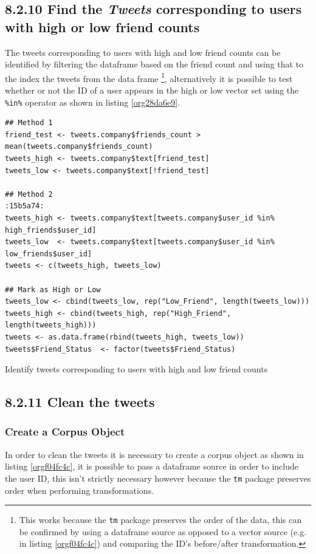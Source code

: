 \documentclass[11pt]{article}
\begin{document}
\subsection{8.2.10 Find the \emph{Tweets} corresponding to users with high or low friend counts}
\label{sec:org5db9549}
The tweets corresponding to users with high and low friend counts can be
identified by filtering the dataframe based on the friend count and using that
to the index the tweets from the data frame \footnote{This works because the \texttt{tm} package preserves the order of the data, this can be confirmed by using a dataframe source as opposed to a vector source (e.g. in listing \ref{orgf04fc4c}) and comparing the ID's before/after transformation.}, alternatively it is possible
to test whether or not the ID of a user appears in the high or low vector
set using the \texttt{\%in\%} operator as shown in listing \ref{org28da6e9}.

\begin{listing}[htbp]
\begin{verbatim}
## Method 1
friend_test <- tweets.company$friends_count > mean(tweets.company$friends_count)
tweets_high <- tweets.company$text[friend_test]
tweets_low <- tweets.company$text[!friend_test]

## Method 2                                                                 :15b5a74:
tweets_high <- tweets.company$text[tweets.company$user_id %in%  high_friends$user_id]
tweets_low  <- tweets.company$text[tweets.company$user_id %in%  low_friends$user_id]
tweets <- c(tweets_high, tweets_low)

## Mark as High or Low
tweets_low <- cbind(tweets_low, rep("Low_Friend", length(tweets_low)))
tweets_high <- cbind(tweets_high, rep("High_Friend", length(tweets_high)))
tweets <- as.data.frame(rbind(tweets_high, tweets_low))
tweets$Friend_Status  <- factor(tweets$Friend_Status)
\end{verbatim}
\caption{\label{org28da6e9}Identify tweets corresponding to users with high and low friend counts}
\end{listing}

\subsection{8.2.11 Clean the tweets}
\label{sec:orge5768c0}
\subsubsection{Create a Corpus Object}
\label{sec:orgbd4add9}
In order to clean the tweets it is necessary to create a corpus object as shown in listing \ref{orgf04fc4c}, it is possible to pass a dataframe source in order to include the user ID, this isn't strictly necessary however because the \texttt{tm} package preserves order when performing transformations.
\end{document}
